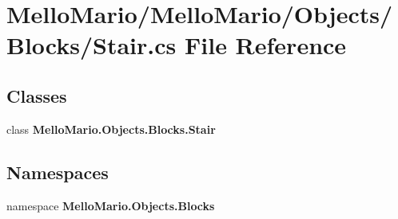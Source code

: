 \section{Mello\+Mario/\+Mello\+Mario/\+Objects/\+Blocks/\+Stair.cs File Reference}
\label{Stair_8cs}
\subsection*{Classes}
\begin{DoxyCompactItemize}
\item 
class \textbf{ Mello\+Mario.\+Objects.\+Blocks.\+Stair}
\end{DoxyCompactItemize}
\subsection*{Namespaces}
\begin{DoxyCompactItemize}
\item 
namespace \textbf{ Mello\+Mario.\+Objects.\+Blocks}
\end{DoxyCompactItemize}
